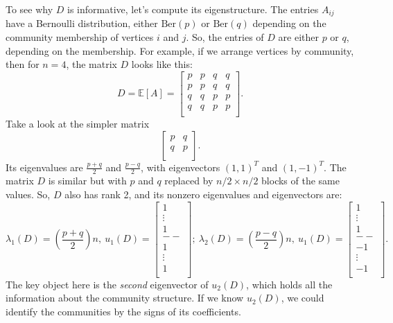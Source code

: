 To see why $D$ is informative, let's compute its eigenstructure. The entries $A_{ij}$ have a Bernoulli 
distribution, either $\mathrm{Ber}(p)$ or $\mathrm{Ber}(q)$ depending on the community membership of vertices 
$i$ and $j$. So, the entries of $D$ are either $p$ or $q$, depending on the membership. For example, if we 
arrange vertices by community, then for $n = 4$, the matrix $D$ looks like this:
\[ D = \mathbb{E}\left[ A \right] = \begin{bmatrix}
p & p & q & q \\
p & p & q & q \\
q & q & p & p \\
q & q & p & p \\
\end{bmatrix}. \]
Take a look at the simpler matrix 
\[ \begin{bmatrix}
p & q \\
q & p \\
\end{bmatrix}. \]
Its eigenvalues are $\frac{p + q}{2}$ and $\frac{p - q}{2}$, with eigenvectors $(1, 1)^T$ and $(1, -1)^T$. 
The matrix $D$ is similar but with $p$ and $q$ replaced by $n/2 \times n/2$ blocks of the same values. So, $D$ 
also has rank 2, and its nonzero eigenvalues and eigenvectors are:
\[ \lambda_1(D) = \left( \frac{p + q}{2} \right)n, \ u_1(D) = \begin{bmatrix}
1 \\
\vdots \\
1 \\
-- \\
1 \\
\vdots \\
1 \\
\end{bmatrix}; \
\lambda_2(D) = \left( \frac{p - q}{2} \right)n, \ u_1(D) = \begin{bmatrix}
1 \\
\vdots \\
1 \\
-- \\
-1 \\
\vdots \\
-1 \\
\end{bmatrix}. \]
The key object here is the \textit{second} eigenvector of $u_2(D)$, which holds all the information about the 
community structure. If we know $u_2(D)$, we could identify the communities by the signs of its coefficients.


